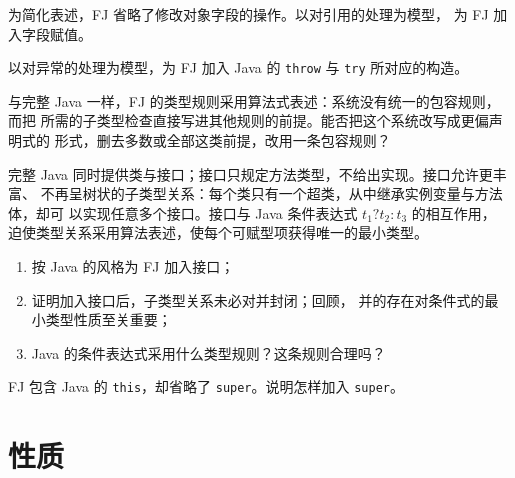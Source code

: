 \begin{exercise}
\label{ex:19.4.3}
为简化表述，FJ 省略了修改对象字段的操作。以对引用的处理为模型，
为 FJ 加入字段赋值。
\end{exercise}

\begin{exercise}[\(\star\star\star\), \(\nrightarrow\)]
\label{ex:19.4.4}
以对异常的处理为模型，为 FJ 加入 Java 的 \texttt{throw} 与
\texttt{try} 所对应的构造。
\end{exercise}

\begin{exercise}[\(\star\star\), \(\nrightarrow\)]
\label{ex:19.4.5}
与完整 Java 一样，FJ 的类型规则采用算法式表述：系统没有统一的包容规则，而把
所需的子类型检查直接写进其他规则的前提。能否把这个系统改写成更偏声明式的
形式，删去多数或全部这类前提，改用一条包容规则？
\end{exercise}

\begin{exercise}[\(\star\star\star\)]
\label{ex:19.4.6}
完整 Java 同时提供类与接口；接口只规定方法类型，不给出实现。接口允许更丰富、
不再呈树状的子类型关系：每个类只有一个超类，从中继承实例变量与方法体，却可
以实现任意多个接口。接口与 Java 条件表达式 \(t_1?t_2:t_3\) 的相互作用，
迫使类型关系采用算法表述，使每个可赋型项获得唯一的最小类型。
\begin{enumerate}
\item 按 Java 的风格为 FJ 加入接口；
\item 证明加入接口后，子类型关系未必对并封闭；回顾，
  并的存在对条件式的最小类型性质至关重要；
\item Java 的条件表达式采用什么类型规则？这条规则合理吗？
\end{enumerate}
\end{exercise}

\begin{exercise}[\(\star\star\star\)]
\label{ex:19.4.7}
FJ 包含 Java 的 \texttt{this}，却省略了 \texttt{super}。说明怎样加入
\texttt{super}。
\end{exercise}

\section{性质}
\label{sec:19.5}

